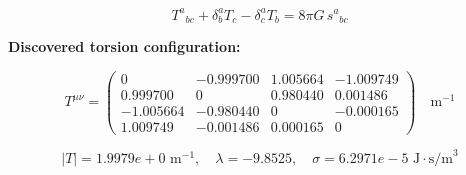 
\begin{equation}
  T^a{}_{bc} + \delta^a_b T_c - \delta^a_c T_b = 8\pi G \, s^a{}_{bc}
\end{equation}

\textbf{Discovered torsion configuration:}

\begin{equation}
  T^{\mu\nu} = \begin{pmatrix}
    0 & -0.999700 & 1.005664 & -1.009749 \\
    0.999700 & 0 & 0.980440 & 0.001486 \\
    -1.005664 & -0.980440 & 0 & -0.000165 \\
    1.009749 & -0.001486 & 0.000165 & 0
  \end{pmatrix} \quad \text{m}^{-1}
\end{equation}

\begin{equation}
  |T| = 1.9979e+0 \text{ m}^{-1}, \quad
  \lambda = -9.8525, \quad
  \sigma = 6.2971e-5 \text{ J}\cdot\text{s/m}^3
\end{equation}